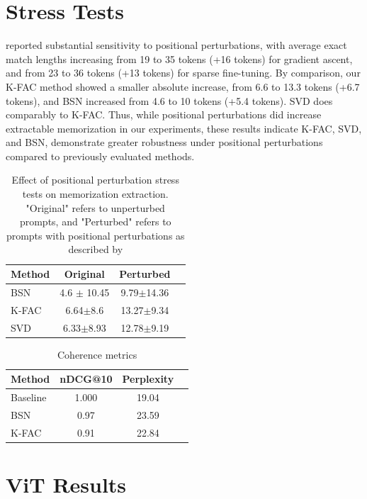 \documentclass{article} %
\begin{document}
\section{Stress Tests}
\label{sec:stress_tests}
\citet{huang2024demystifying} reported substantial sensitivity to positional perturbations, with average exact match lengths increasing from 19 to 35 tokens (+16 tokens) for gradient ascent, and from 23 to 36 tokens (+13 tokens) for sparse fine-tuning. By comparison, our K-FAC method showed a smaller absolute increase, from 6.6 to 13.3 tokens (+6.7 tokens), and BSN increased from 4.6 to 10 tokens (+5.4 tokens). SVD does comparably to K-FAC. Thus, while positional perturbations did increase extractable memorization in our experiments, these results indicate K-FAC, SVD, and BSN, demonstrate greater robustness under positional perturbations compared to previously evaluated methods.
\begin{table}[htbp]
\centering
\small
\begin{tabular}{lccc}
\toprule
 Method & Original & Perturbed  \\
\midrule
BSN & 4.6 $\pm$ 10.45 & 9.79$\pm$14.36 \\
K-FAC & 6.64$\pm$8.6 & 13.27$\pm$9.34 \\
SVD & 6.33$\pm$8.93 & 12.78$\pm$9.19 \\
\bottomrule
\end{tabular}
\caption{Effect of positional perturbation stress tests on memorization extraction. 
"Original" refers to unperturbed prompts, and "Perturbed" refers to prompts with positional perturbations as described by \citep{huang2024demystifying}}
\label{tab:positional_perturb_results}
\end{table}

\begin{table}[t]
\centering
\small
\begin{tabular}{lccc}
\toprule
Method & nDCG@10 & Perplexity \\
\midrule
Baseline & 1.000 & 19.04 \\
BSN & 0.97 & 23.59 \\
K-FAC & 0.91 & 22.84 \\
\bottomrule
\end{tabular}
\caption{Coherence metrics}
\label{tab:results_coherence}
\vspace{-0.5em}
\end{table}

\section{ViT Results}
\end{document}
